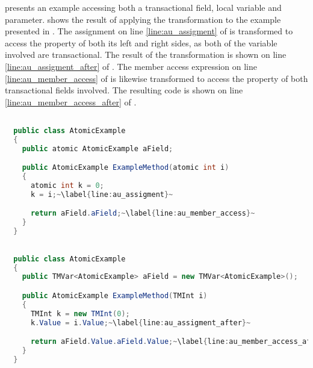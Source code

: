  presents an example accessing both a transactional field, local variable and parameter.  shows the result of applying the transformation to the example presented in . The assignment on line \ref{line:au_assigment} of  is transformed to access the  property of both its left and right sides, as both of the variable involved are transactional. The result of the transformation is shown on line \ref{line:au_assigment_after} of . The member access expression on line \ref{line:au_member_access} of  is likewise transformed to access the  property of both transactional fields involved. The resulting code is shown on line \ref{line:au_member_access_after} of .

\begin{lstlisting}[label=lst:before_atomic_usage,
  caption={Usage of \bscode{atomic} Variables Before Transformation},
  language=Java,  
  showspaces=false,
  showtabs=false,
  breaklines=true,
  showstringspaces=false,
  breakatwhitespace=true,
  escapechar=~,
  commentstyle=\color{greencomments},
  keywordstyle=\color{bluekeywords},
  stringstyle=\color{redstrings},
  morekeywords={atomic, retry, orelse, var, get, set}]  % Start your code-block

  public class AtomicExample
  {
    public atomic AtomicExample aField;

    public AtomicExample ExampleMethod(atomic int i)
    {
      atomic int k = 0;
      k = i;~\label{line:au_assigment}~

      return aField.aField;~\label{line:au_member_access}~
    }
  }
\end{lstlisting}

\begin{lstlisting}[label=lst:after_atomic_usage,
  caption={Usage of \bscode{atomic} Variables After Transformation},
  language=Java,  
  showspaces=false,
  showtabs=false,
  breaklines=true,
  showstringspaces=false,
  breakatwhitespace=true,
  escapechar=~,
  commentstyle=\color{greencomments},
  keywordstyle=\color{bluekeywords},
  stringstyle=\color{redstrings},
  morekeywords={atomic, retry, orelse, var, get, set}]  % Start your code-block

  public class AtomicExample
  {
    public TMVar<AtomicExample> aField = new TMVar<AtomicExample>();

    public AtomicExample ExampleMethod(TMInt i)
    {
      TMInt k = new TMInt(0);
      k.Value = i.Value;~\label{line:au_assigment_after}~

      return aField.Value.aField.Value;~\label{line:au_member_access_after}~
    }
  }
\end{lstlisting}

